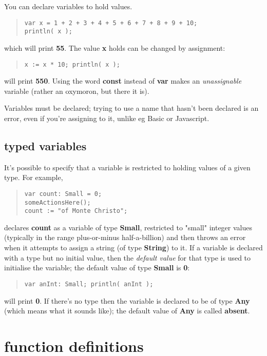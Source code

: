 \documentclass{report}
\begin{document}
You can declare variables to hold values.

\begin{quote}
\begin{verbatim}
var x = 1 + 2 + 3 + 4 + 5 + 6 + 7 + 8 + 9 + 10;
println( x );
\end{verbatim}
\end{quote}
which will print {\bf 55}. The value {\bf x} holds can be changed
by assignment:

\begin{quote}
\begin{verbatim}
x := x * 10; println( x );
\end{verbatim}
\end{quote}
will print {\bf 550}. Using the word {\bf const} instead of {\bf var}
makes an {\em unassignable} variable (rather an oxymoron, but there it is).

Variables must be declared; trying to use a name that hasn't been declared is
an error, even if you're assigning to it, unlike eg Basic or Javascript.\section{typed variables}


It's possible to specify that a variable is restricted to holding values of a
given type. For example,

\begin{quote}
\begin{verbatim}
var count: Small = 0;
someActionsHere();
count := "of Monte Christo";
\end{verbatim}
\end{quote}
declares {\bf count} as a variable of type {\bf Small}, restricted to "small" integer
values (typically in the range plus-or-minus half-a-billion) and then throws
an error when it attempts to assign a string (of type {\bf String}) to it. If a
variable is declared with a type but no initial value, then the {\em default
value} for that type is used to initialise the variable; the default value of
type {\bf Small} is {\bf 0}:

\begin{quote}
\begin{verbatim}
var anInt: Small; println( anInt );
\end{verbatim}
\end{quote}
will print {\bf 0}. If there's no type then the variable is declared to be of type
{\bf Any} (which means what it sounds like); the default value of {\bf Any} is called
{\bf absent}.\chapter{function definitions}
\end{document}
